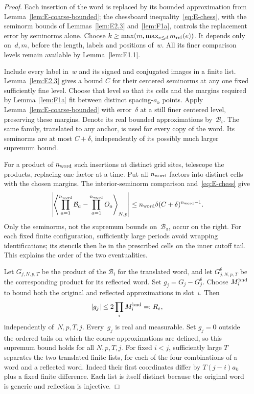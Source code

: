 \begin{proof}
Each insertion of the word is replaced by its bounded approximation from Lemma~\ref{lem:E-coarse-bounded}; the chessboard inequality~\eqref{eq:E-chess}, with the seminorm bounds of Lemmas~\ref{lem:E2.3} and~\ref{lem:F1a}, controls the replacement error by seminorms alone. Choose
$k\ge\max(m,\max_{e\le d}m_{\mathrm{ref}}(e))$. It depends only on~$d,m$, before the length, labels and positions of~$w$. All its finer comparison levels remain available by Lemma~\ref{lem:E1.1}.

Include every label in~$w$ and its signed and conjugated images in a finite list. Lemma~\ref{lem:E2.3} gives a bound $C$ for their centered seminorms at any one fixed sufficiently fine level. Choose that level so that its cells and the margins required by Lemma~\ref{lem:F1a} fit between distinct spacing-$a_k$ points. Apply Lemma~\ref{lem:E-coarse-bounded} with error~$\delta$ at a still finer centered level, preserving these margins. Denote its real bounded approximations by~$\mathcal B_i$. The same family, translated to any anchor, is used for every copy of the word. Its seminorms are at most $C+\delta$, independently of its possibly much larger supremum bound.

For a product of $n_{\rm word}$ such insertions at distinct grid sites, telescope the products, replacing one factor at a time. Put all $n_{\rm word}$ factors into distinct cells with the chosen margins. The interior-seminorm comparison and~\eqref{eq:E-chess} give
\begin{equation}\label{eq:E-word-error}
 \left|\left\langle\prod_{a=1}^{n_{\rm word}} \mathcal B_a-\prod_{a=1}^{n_{\rm word}} O_a\right\rangle_{N,p}\right|
 \le n_{\rm word}\delta(C+\delta)^{n_{\rm word}-1}.
\end{equation}
Only the seminorms, not the supremum bounds on~$\mathcal B_a$, occur on the right. For each fixed finite configuration, sufficiently large periods avoid wrapping identifications; its stencils then lie in the prescribed cells on the inner cutoff tail. This explains the order of the two eventualities.

Let $G_{j,N,p,T}$ be the product of the $\mathcal B_i$ for the translated word, and let $G^\theta_{j,N,p,T}$ be the corresponding product for its reflected word. Set $g_j=G_j-G^\theta_j$. Choose $M_i^{\rm bnd}$ to bound both the original and reflected approximations in slot~$i$. Then
\begin{equation*}
 |g_j|\le 2\prod_iM_i^{\rm bnd}=:R_\varepsilon,
\end{equation*}
independently of~$N,p,T,j$. Every~$g_j$ is real and measurable. Set $g_j=0$ outside the ordered tails on which the coarse approximations are defined, so this supremum bound holds for all $N,p,T,j$. For fixed $i<j$, sufficiently large $T$ separates the two translated finite lists, for each of the four combinations of a word and a reflected word. Indeed their first coordinates differ by $T(j-i)a_k$ plus a fixed finite difference. Each list is itself distinct because the original word is generic and reflection is injective.


\end{proof}
